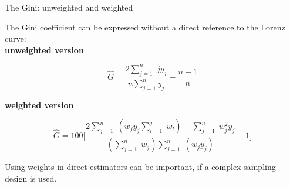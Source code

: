 \documentclass[fleqn,final]{beamer}
\newcommand{\Pheight}{\rule[-5mm]{0cm}{1cm}}
\begin{document}
\begin{frame}
\begin{columns}[t]
\begin{column}{.3\linewidth}
 \begin{block}{The Gini: unweighted and weighted \Pheight}
The Gini coefficient can be expressed without a direct reference to the Lorenz curve:\\
\vskip 0.5cm
\textbf{unweighted version}
\begin{tcolorbox}
\begin{equation*}
\hat{G}={\frac {2\sum_{j=1}^{n}\;jy_{j}}{n\sum _{j=1}^{n}y_{j}}}-{\frac {n+1}{n}}
\end{equation*}
\end{tcolorbox}
\vskip 0.5cm
\textbf{weighted version}
\begin{tcolorbox}
\begin{equation*}
\hat{G}=100\Bigg[{\frac {2\sum_{j=1}^{n}\;(w_{j}y_{j}\sum_{l=1}^{j}\;w_{l})-\sum_{j=1}^{n}\;w_{j}^{2}y_{j}}{(\sum_{j=1}^{n}\;w_{j})\sum_{j=1}^{n}\;(w_{j}y_{j})}-1}\Bigg]
\end{equation*}
\end{tcolorbox}
\vskip 0.5cm
{\selectfont{}\relax} Using weights in direct estimators can be important, if a complex sampling design is used. 
\end{block}
\end{column}

%
%

\end{columns}


\begin{columns}[t]


%
%



\end{columns}
\end{frame}
\end{document}
